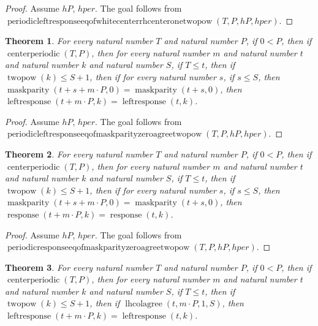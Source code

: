\documentclass[11pt]{article}
\newtheorem{theorem}{Theorem}[section]
\theoremstyle{definition}
\begin{document}
\begin{proof}
Assume \(hP\), \(hper\).
The goal follows from \(\operatorname{periodicleftresponseeqofwhitecenterrhcenteronetwopow}(T, P, hP, hper)\).
\end{proof}
\begin{theorem}
\label{ll:paper:periodic-leftresponse-eq-of-maskparity-zero-agree-twopow}
For every natural number \(T\) and natural number \(P\), if \(0 < P\), then if \(\operatorname{centerperiodic}(T, P)\), then for every natural number \(m\) and natural number \(t\) and natural number \(k\) and natural number \(S\), if \(T \le t\), then if \(\operatorname{twopow}(k) \le S + 1\), then if for every natural number \(s\), if \(s \le S\), then \(\operatorname{maskparity}(t + s + m \cdot P, 0) = \operatorname{maskparity}(t + s, 0)\), then \(\operatorname{leftresponse}(t + m \cdot P, k) = \operatorname{leftresponse}(t, k)\).
\end{theorem}
\begin{proof}
Assume \(hP\), \(hper\).
The goal follows from \(\operatorname{periodicleftresponseeqofmaskparityzeroagreetwopow}(T, P, hP, hper)\).
\end{proof}
\begin{theorem}
\label{ll:paper:periodic-response-eq-of-maskparity-zero-agree-twopow}
For every natural number \(T\) and natural number \(P\), if \(0 < P\), then if \(\operatorname{centerperiodic}(T, P)\), then for every natural number \(m\) and natural number \(t\) and natural number \(k\) and natural number \(S\), if \(T \le t\), then if \(\operatorname{twopow}(k) \le S + 1\), then if for every natural number \(s\), if \(s \le S\), then \(\operatorname{maskparity}(t + s + m \cdot P, 0) = \operatorname{maskparity}(t + s, 0)\), then \(\operatorname{response}(t + m \cdot P, k) = \operatorname{response}(t, k)\).
\end{theorem}
\begin{proof}
Assume \(hP\), \(hper\).
The goal follows from \(\operatorname{periodicresponseeqofmaskparityzeroagreetwopow}(T, P, hP, hper)\).
\end{proof}
\begin{theorem}
\label{ll:paper:periodic-leftresponse-eq-of-lhcolagree-one-twopow}
For every natural number \(T\) and natural number \(P\), if \(0 < P\), then if \(\operatorname{centerperiodic}(T, P)\), then for every natural number \(m\) and natural number \(t\) and natural number \(k\) and natural number \(S\), if \(T \le t\), then if \(\operatorname{twopow}(k) \le S + 1\), then if \(\operatorname{lhcolagree}(t, m \cdot P, 1, S)\), then \(\operatorname{leftresponse}(t + m \cdot P, k) = \operatorname{leftresponse}(t, k)\).
\end{theorem}
\end{document}

